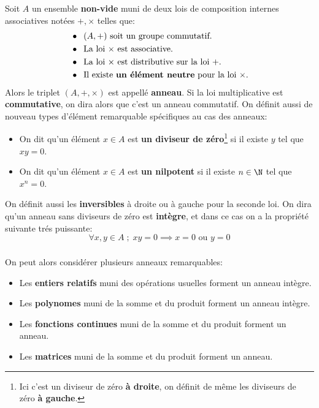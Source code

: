 \chapter*{}
Soit \(A\) un ensemble \textbf{non-vide} muni de deux lois de composition internes associatives notées \(+, \times\) telles que:
\begin{align*}
   &\bullet \;\; (A, +) \text{ soit un groupe commutatif.} \\
   &\bullet \;\; \text{La loi \(\times\) est associative.}\\
   &\bullet \;\; \text{La loi \(\times\) est distributive sur la loi \(+\).}\\
   &\bullet \;\; \text{Il existe \textbf{un élément neutre} pour la loi \(\times\).}
\end{align*}
Alors le triplet \((A, +, \times)\) est appellé \textbf{anneau}. Si la loi multiplicative est \textbf{commutative}, on dira alors que c'est un anneau commutatif. On définit aussi de nouveau types d'élément remarquable spécifiques au cas des anneaux:
\begin{itemize}
   \item On dit qu'un élément \(x \in A\) est \textbf{un diviseur de zéro}\footnote[1]{Ici c'est un diviseur de zéro \textbf{à droite}, on définit de même les diviseurs de zéro \textbf{à gauche}.} si il existe \( y \) tel que \( xy = 0 \).
   \item On dit qu'un élément \(x \in A\) est \textbf{un nilpotent} si il existe \( n \in \N \) tel que \(x^n = 0\).
\end{itemize}
On définit aussi les \textbf{inversibles} à droite ou à gauche pour la seconde loi. On dira qu'un anneau sans diviseurs de zéro est \textbf{intègre}, et dans ce cas on a la propriété suivante trés puissante:
\[ 
   \forall x, y \in A \; ; \; xy = 0 \implies x = 0 \text{ ou } y = 0 
\]
\subsection*{}
On peut alors considérer plusieurs anneaux remarquables:
\begin{itemize}
   \item Les \textbf{entiers relatifs} muni des opérations usuelles forment un anneau intègre.
   \item Les \textbf{polynomes} muni de la somme et du produit forment un anneau intègre.
   \item Les \textbf{fonctions continues} muni de la somme et du produit forment un anneau.
   \item Les \textbf{matrices} muni de la somme et du produit forment un anneau.
\end{itemize}

